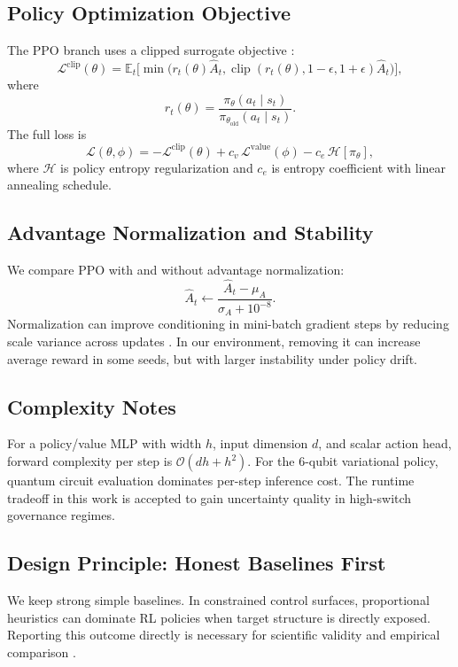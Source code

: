 \subsection{Policy Optimization Objective}

The PPO branch uses a clipped surrogate objective \citep{schulman2017ppo}:
\begin{equation}
\mathcal{L}^{\text{clip}}(\theta) = \mathbb{E}_t\Big[\min\big(r_t(\theta)\hat{A}_t, \operatorname{clip}(r_t(\theta), 1-\epsilon, 1+\epsilon)\hat{A}_t\big)\Big],
\end{equation}
where
\begin{equation}
r_t(\theta) = \frac{\pi_\theta(a_t\mid s_t)}{\pi_{\theta_{\text{old}}}(a_t\mid s_t)}.
\end{equation}
The full loss is
\begin{equation}
\mathcal{L}(\theta, \phi) = -\mathcal{L}^{\text{clip}}(\theta) + c_v\,\mathcal{L}^{\text{value}}(\phi) - c_e\,\mathcal{H}[\pi_\theta],
\end{equation}
where $\mathcal{H}$ is policy entropy regularization and $c_e$ is entropy coefficient with linear annealing schedule.

\subsection{Advantage Normalization and Stability}

We compare PPO with and without advantage normalization:
\begin{equation}
\hat{A}_t \leftarrow \frac{\hat{A}_t - \mu_A}{\sigma_A + 10^{-8}}.
\end{equation}
Normalization can improve conditioning in mini-batch gradient steps by reducing scale variance across updates \citep{sutton2018reinforcement}. In our environment, removing it can increase average reward in some seeds, but with larger instability under policy drift.

\subsection{Complexity Notes}

For a policy/value MLP with width $h$, input dimension $d$, and scalar action head, forward complexity per step is $\mathcal{O}(dh + h^2)$. For the 6-qubit variational policy, quantum circuit evaluation dominates per-step inference cost. The runtime tradeoff in this work is accepted to gain uncertainty quality in high-switch governance regimes.

\subsection{Design Principle: Honest Baselines First}

We keep strong simple baselines. In constrained control surfaces, proportional heuristics can dominate RL policies when target structure is directly exposed. Reporting this outcome directly is necessary for scientific validity and empirical comparison \citep{pineau2021improving}.
